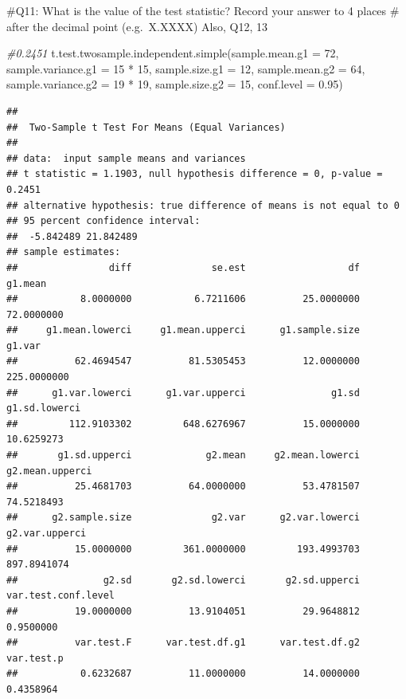 \documentclass[
]{article}
\newenvironment{Shaded}{\begin{snugshade}}{\end{snugshade}}
\newcommand{\AttributeTok}[1]{\textcolor[rgb]{0.77,0.63,0.00}{#1}}
\newcommand{\CommentTok}[1]{\textcolor[rgb]{0.56,0.35,0.01}{\textit{#1}}}
\newcommand{\DecValTok}[1]{\textcolor[rgb]{0.00,0.00,0.81}{#1}}
\newcommand{\FloatTok}[1]{\textcolor[rgb]{0.00,0.00,0.81}{#1}}
\newcommand{\FunctionTok}[1]{\textcolor[rgb]{0.00,0.00,0.00}{#1}}
\newcommand{\NormalTok}[1]{#1}
\newcommand{\SpecialCharTok}[1]{\textcolor[rgb]{0.00,0.00,0.00}{#1}}
\begin{document}
\#Q11: What is the value of the test statistic? Record your answer to 4
places \# after the decimal point (e.g.~X.XXXX) Also, Q12, 13

\begin{Shaded}
\begin{Highlighting}[]
\CommentTok{\#0.2451}
\FunctionTok{t.test.twosample.independent.simple}\NormalTok{(}\AttributeTok{sample.mean.g1 =} \DecValTok{72}\NormalTok{,}
                                    \AttributeTok{sample.variance.g1 =} \DecValTok{15} \SpecialCharTok{*} \DecValTok{15}\NormalTok{, }
                                    \AttributeTok{sample.size.g1 =} \DecValTok{12}\NormalTok{, }
                                    \AttributeTok{sample.mean.g2 =} \DecValTok{64}\NormalTok{, }
                                    \AttributeTok{sample.variance.g2 =} \DecValTok{19} \SpecialCharTok{*} \DecValTok{19}\NormalTok{, }
                                    \AttributeTok{sample.size.g2 =} \DecValTok{15}\NormalTok{, }
                                    \AttributeTok{conf.level =} \FloatTok{0.95}\NormalTok{)}
\end{Highlighting}
\end{Shaded}

\begin{verbatim}
## 
##  Two-Sample t Test For Means (Equal Variances)
## 
## data:  input sample means and variances
## t statistic = 1.1903, null hypothesis difference = 0, p-value = 0.2451
## alternative hypothesis: true difference of means is not equal to 0
## 95 percent confidence interval:
##  -5.842489 21.842489
## sample estimates:
##                diff              se.est                  df             g1.mean 
##           8.0000000           6.7211606          25.0000000          72.0000000 
##     g1.mean.lowerci     g1.mean.upperci      g1.sample.size              g1.var 
##          62.4694547          81.5305453          12.0000000         225.0000000 
##      g1.var.lowerci      g1.var.upperci               g1.sd       g1.sd.lowerci 
##         112.9103302         648.6276967          15.0000000          10.6259273 
##       g1.sd.upperci             g2.mean     g2.mean.lowerci     g2.mean.upperci 
##          25.4681703          64.0000000          53.4781507          74.5218493 
##      g2.sample.size              g2.var      g2.var.lowerci      g2.var.upperci 
##          15.0000000         361.0000000         193.4993703         897.8941074 
##               g2.sd       g2.sd.lowerci       g2.sd.upperci var.test.conf.level 
##          19.0000000          13.9104051          29.9648812           0.9500000 
##          var.test.F      var.test.df.g1      var.test.df.g2          var.test.p 
##           0.6232687          11.0000000          14.0000000           0.4358964
\end{verbatim}
\end{document}

